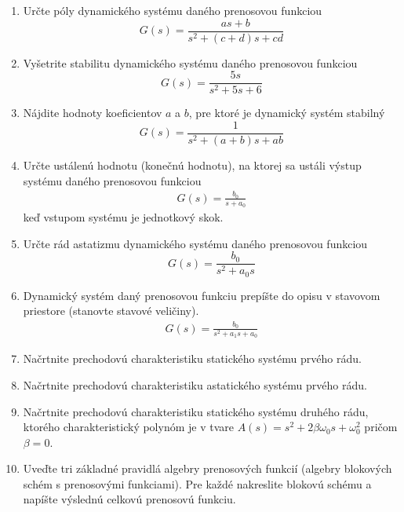 \documentclass[a4paper, 10pt, ]{article}
\begin{document}
\begin{enumerate}[leftmargin=0pt, labelsep=3mm, itemsep=0pt]
    \item Určte póly dynamického systému daného prenosovou funkciou
    \begin{equation*}
        G(s) = \frac{a s + b}{s^2 + (c+d) s + cd}
    \end{equation*}


    \item Vyšetrite stabilitu dynamického systému daného prenosovou funkciou
    \begin{equation*}
        G(s) = \frac{5 s }{s^2 + 5 s + 6}
    \end{equation*}

    \item Nájdite hodnoty koeficientov $a$ a $b$, pre ktoré je dynamický systém stabilný
    \begin{equation*}
        G(s) = \frac{1}{s^2 + (a+b) s + ab}
    \end{equation*}


    \item Určte ustálenú hodnotu (konečnú hodnotu), na ktorej sa ustáli výstup systému daného prenosovou funkciou
    \begin{align*}
        G(s) = \frac{b_0}{s + a_0}
    \end{align*}
    keď vstupom systému je jednotkový skok.


    \item Určte rád astatizmu dynamického systému daného prenosovou funkciou
    \begin{equation*}
        G(s) = \frac{b_0}{s^2 + a_0 s}
    \end{equation*}



    \item Dynamický systém daný prenosovou funkciu prepíšte do opisu v stavovom priestore (stanovte stavové veličiny).
    \begin{align*}
        G(s) = \frac{b_0}{s^2 + a_1 s + a_0}
    \end{align*}

    \item Načrtnite prechodovú charakteristiku statického systému prvého rádu.

    \item Načrtnite prechodovú charakteristiku astatického systému prvého rádu.

    \item Načrtnite prechodovú charakteristiku statického systému druhého rádu, ktorého charakteristický polynóm je v tvare $A(s) = s^2 + 2 \beta \omega_0 s + \omega_0^2$ pričom $\beta = 0$.

    \item Uveďte tri základné pravidlá algebry prenosových funkcií (algebry blokových schém s prenosovými funkciami). Pre každé nakreslite blokovú schému a napíšte výslednú celkovú prenosovú funkciu.

\end{enumerate}








{}
% 

\end{document}
